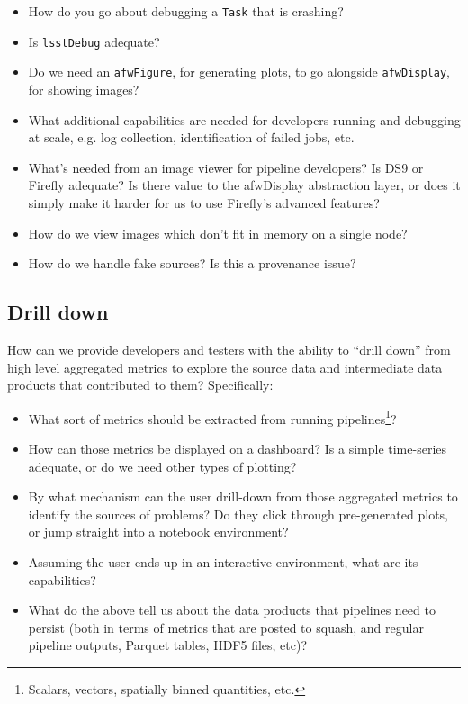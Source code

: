 \begin{itemize}

  \item{How do you go about debugging a \texttt{Task} that is crashing?}
  \item{Is \texttt{lsstDebug} adequate?}
  \item{Do we need an \texttt{afwFigure}, for generating plots, to go alongside \texttt{afwDisplay}, for showing images?}
  \item{What additional capabilities are needed for developers running and debugging at scale, e.g. log collection, identification of failed jobs, etc.}
  \item{What's needed from an image viewer for pipeline developers? Is DS9 or Firefly adequate? Is there value to the afwDisplay abstraction layer, or does it simply make it harder for us to use Firefly's advanced features?}
  \item{How do we view images which don't fit in memory on a single node?}
  \item{How do we handle fake sources? Is this a provenance issue?}

\end{itemize}

\subsection{Drill down}
\label{sec:approach:drill}

How can we provide developers and testers with the ability to ``drill down''
from high level aggregated metrics to explore the source data and intermediate
data products that contributed to them? Specifically:

\begin{itemize}

  \item{What sort of metrics should be extracted from running pipelines\footnote{Scalars, vectors, spatially binned quantities, etc.}?}
  \item{How can those metrics be displayed on a dashboard? Is a simple time-series adequate, or do we need other types of plotting?}
  \item{By what mechanism can the user drill-down from those aggregated metrics to identify the sources of problems? Do they click through pre-generated plots, or jump straight into a notebook environment?}
  \item{Assuming the user ends up in an interactive environment, what are its capabilities?}
  \item{What do the above tell us about the data products that pipelines need to persist (both in terms of metrics that are posted to \gls{squash}, and regular pipeline outputs, Parquet tables, HDF5 files, etc)?}

\end{itemize}

